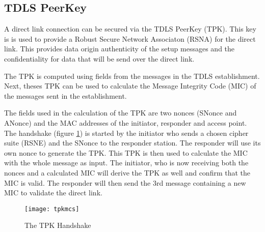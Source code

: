 \subsection{TDLS PeerKey}
\label{sec:tdls-peerkey}

A direct link connection can be secured via the TDLS PeerKey (TPK). This key is is used to provide a Robust Secure Network Associaton (RSNA) for the direct link. This provides data origin authenticity of the setup messages and the confidentiality for data that will be send over the direct link.

The TPK is computed using fields from the messages in the TDLS establishment. Next, theses TPK can be used to calculate the Message Integrity Code (MIC) of the messages sent in the establishment.

The fields used in the calculation of the TPK are two nonces (SNonce and ANonce) and the MAC addresses of the initiator, responder and access point. The handshake (figure \ref{fig:tpk-mcs}) is started by the initiator who sends a chosen cipher suite (RSNE) and the SNonce to the responder station. The responder will use its own nonce to generate the TPK. This TPK is then used to calculate the MIC with the whole message as input. The initiator, who is now receiving both the nonces and a calculated MIC will derive the TPK as well and confirm that the MIC is valid. The responder will then send the 3rd message containing a new MIC to validate the direct link.

\begin{figure}[!h]
	\centering
	\texttt{[image: tpkmcs]}
	\caption{The TPK Handshake}
	\label{fig:tpk-mcs}
\end{figure}
